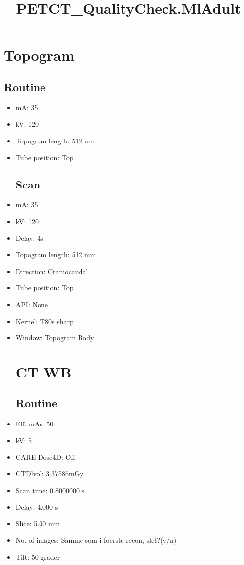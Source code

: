 \documentclass[12pt]{article}
\title{PETCT\_QualityCheck.MlAdult}
\begin{document}
\maketitle
\newpage
\tableofcontents
\newpage
{}


\section{Topogram}
\subsection{Routine}
 \begin{itemize}\item mA: 35\item kV: 120\item Topogram length: 512 mm\item Tube position: Top
\subsection{Scan}
\item mA: 35\item kV: 120\item Delay: 4s\item Topogram length: 512 mm\item Direction: Craniocaudal\item Tube position: Top\item API: None\item Kernel: T80s sharp\item Window: Topogram Body
\section{CT WB}
\subsection{Routine}
\item Eff. mAs: 50\item kV: 5\item CARE Dose4D: Off\item CTDlvol: 3.37586mGy\item Scan time: 0.8000000 s\item Delay: 4.000 s\item Slice: 5.00 mm\item No. of images: Samme som i foerste recon, slet?(y/n)\item Tilt: 50 grader

\end{itemize}
\end{document}
